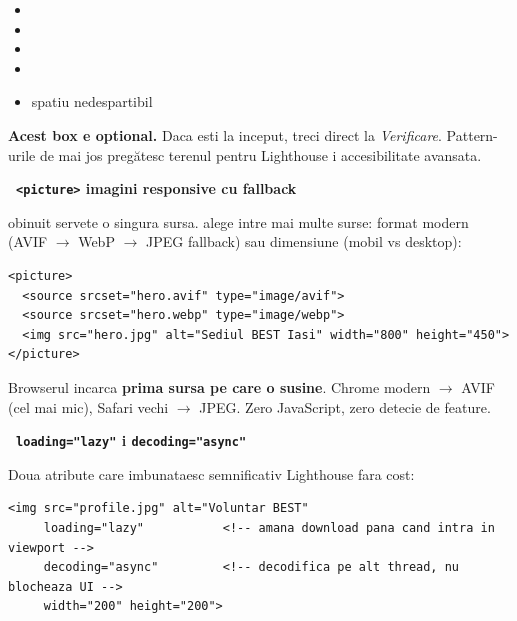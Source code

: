 \begin{itemize}[itemsep=1pt]
  \item {} \textendash{} \code{<}
  \item {} \textendash{} \code{>}
  \item {} \textendash{} \code{\&}
  \item {} \textendash{} 
  \item {} \textendash{} spatiu nedespartibil
\end{itemize}

\begin{bonusbox}
\textbf{Acest box e optional.} Daca esti la inceput, treci direct la \emph{Verificare}. Pattern-urile de mai jos preg\u atesc terenul pentru Lighthouse i accesibilitate avansata.

\medskip

\textbf{\faImage\ \texttt{<picture>} \textendash{} imagini responsive cu fallback}

 obinuit servete o singura sursa.  alege intre mai multe surse: format modern (AVIF $\to$ WebP $\to$ JPEG fallback) sau dimensiune (mobil vs desktop):

\begin{lstlisting}[style=html, numbers=none]
<picture>
  <source srcset="hero.avif" type="image/avif">
  <source srcset="hero.webp" type="image/webp">
  <img src="hero.jpg" alt="Sediul BEST Iasi" width="800" height="450">
</picture>
\end{lstlisting}

Browserul incarca \textbf{prima sursa pe care o susine}. Chrome modern $\to$ AVIF (cel mai mic), Safari vechi $\to$ JPEG. Zero JavaScript, zero detecie de feature.

\medskip

\textbf{\faBolt\ \texttt{loading="lazy"} i \texttt{decoding="async"}}

Doua atribute care imbunataesc semnificativ Lighthouse fara cost:

\begin{lstlisting}[style=html, numbers=none]
<img src="profile.jpg" alt="Voluntar BEST"
     loading="lazy"           <!-- amana download pana cand intra in viewport -->
     decoding="async"         <!-- decodifica pe alt thread, nu blocheaza UI -->
     width="200" height="200">
\end{lstlisting}


\end{bonusbox}
